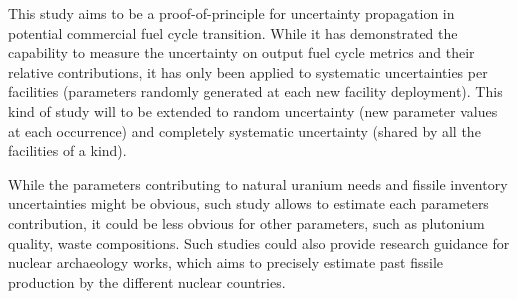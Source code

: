 \documentclass{anstrans}
\begin{document}
This study aims to be a proof-of-principle for uncertainty propagation in
potential commercial fuel cycle transition. While it has demonstrated the
capability to measure the uncertainty on output fuel cycle metrics and their
relative contributions, it has only been applied to systematic uncertainties per
facilities (parameters randomly generated at each new facility deployment).
This kind of study will to be extended to random uncertainty (new parameter
values at each occurrence) and completely systematic uncertainty (shared by all
the facilities of a kind).

While the parameters contributing to natural uranium needs and fissile inventory
uncertainties might be obvious, such study allows to estimate each parameters
contribution, it could be less obvious for other parameters, such as
plutonium quality, waste compositions.  Such studies could also provide research
guidance for nuclear archaeology works, which aims to precisely estimate past
fissile production by the different nuclear countries.



\end{document}
